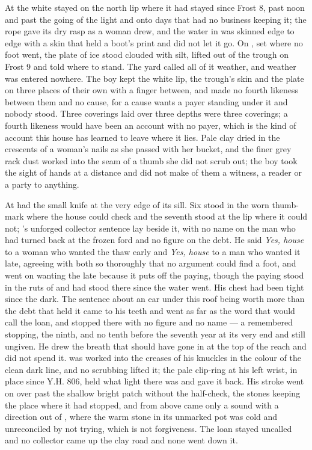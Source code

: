 \scenebreak

At  the white  stayed on the north lip where it had stayed since Frost 8, past noon and past the going of the light and onto days that had no business keeping it; the rope gave its dry rasp as a woman drew, and the water in  was skinned edge to edge with a skin that held a boot's print and did not let it go. On , set where no foot went, the plate of ice stood clouded with silt, lifted out of the trough on Frost 9 and told where to stand. The yard called all of it weather, and weather was entered nowhere. The boy kept the white lip, the trough's skin and the plate on three places of their own with a finger between, and made no fourth likeness between them and no cause, for a cause wants a payer standing under it and nobody stood. Three coverings laid over three depths were three coverings; a fourth likeness would have been an account with no payer, which is the kind of account this house has learned to leave where it lies. Pale clay dried in the crescents of a woman's nails as she passed with her bucket, and the finer grey rack dust worked into the seam of a thumb she did not scrub out; the boy took the sight of hands at a distance and did not make of them a witness, a reader or a party to anything.

At   had the small knife at the very edge of its sill. Six stood in the worn thumb-mark where the house could check and the seventh stood at the lip where it could not; 's unforged collector sentence lay beside it, with no name on the man who had turned back at the frozen ford and no figure on the debt. He said \emph{Yes, house} to a woman who wanted the thaw early and \emph{Yes, house} to a man who wanted it late, agreeing with both so thoroughly that no argument could find a foot, and went on wanting the late because it puts off the paying, though the paying stood in the ruts of  and had stood there since the water went. His chest had been tight since the dark. The sentence about an ear under this roof being worth more than the debt that held it came to his teeth and went as far as the word that would call the loan, and stopped there with no figure and no name --- a remembered stopping, the ninth, and no tenth before the seventh year at its very end and still ungiven. He drew the breath that should have gone in at the top of the reach and did not spend it.  was worked into the creases of his knuckles in the colour of the clean dark line, and no scrubbing lifted it; the pale clip-ring at his left wrist, in place since Y.H. 806, held what light there was and gave it back. His stroke went on over  past the shallow bright patch without the half-check, the stones keeping the place where it had stopped, and from above came only a sound with a direction out of , where the warm stone in its unmarked pot was cold and unreconciled by not trying, which is not forgiveness. The loan stayed uncalled and no collector came up the clay road and none went down it.

